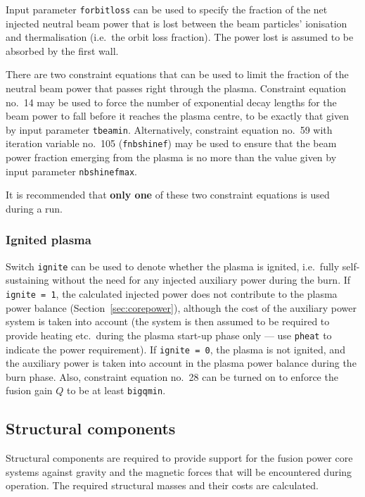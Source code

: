 \documentclass[11pt,a4paper]{report}
\begin{document}
Input parameter \texttt{forbitloss} can be used to specify the fraction of the
net injected neutral beam power that is lost between the beam particles'
ionisation and thermalisation (i.e.\ the orbit loss fraction). The power lost
is assumed to be absorbed by the first wall.

There are two constraint equations that can be used to limit the fraction of
the neutral beam power that passes right through the plasma. Constraint
equation no.\ 14 may be used to force the number of exponential decay lengths
for the beam power to fall before it reaches the plasma centre, to be exactly
that given by input parameter \texttt{tbeamin}. Alternatively, constraint
equation no.\ 59 with iteration variable no.\ 105 (\texttt{fnbshinef}) may be
used to ensure that the beam power fraction emerging from the plasma is no
more than the value given by input parameter \texttt{nbshinefmax}.

It is recommended that \textbf{only one} of these two constraint equations is
used during a run.

\subsubsection{Ignited plasma}
\label{sec:ignited}

Switch \texttt{ignite} can be used to denote whether the plasma is ignited,
i.e.\ fully self-sustaining without the need for any injected auxiliary power
during the burn. If \texttt{ignite = 1}, the calculated injected power does
not contribute to the plasma power balance (Section~\ref{sec:corepower}),
although the cost of the auxiliary power system is taken into account (the
system is then assumed to be required to provide heating etc.\ during the
plasma start-up phase only --- use \texttt{pheat} to indicate the power
requirement). If \texttt{ignite = 0}, the plasma is not ignited, and the
auxiliary power is taken into account in the plasma power balance during the
burn phase. Also, constraint equation no.\ 28 can be turned on to enforce the
fusion gain $Q$ to be at least \texttt{bigqmin}.

\subsection{Structural components}

Structural components are required to provide support for the fusion power
core systems against gravity and the magnetic forces that will be encountered
during operation. The required structural masses and their costs are
calculated.
\end{document}
